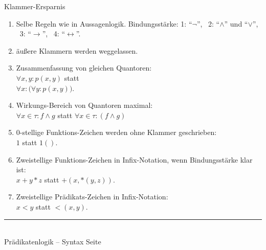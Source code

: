 \documentclass{slides}
\newcommand{\myrule}{\rule{20cm}{1mm}\\ }
\newcounter{mypage}
\begin{document}

\begin{slide}{}
\normalsize
\begin{center}
Klammer-Ersparnis
\end{center}
\vspace{0.5cm}

\footnotesize
\begin{enumerate}
\item Selbe Regeln wie in Aussagenlogik. Bindungsst\"{a}rke: 
  1: ``$\neg$'', \ 2: ``$\wedge$'' und ``$\vee$'', \ 3: ``$\rightarrow$'', \ 4: ``$\leftrightarrow$''.
\item \"{a}ußere Klammern werden weggelassen.
\item Zusammenfassung von gleichen Quantoren: \\[0.3cm]
      \hspace*{1.3cm} $\forall x, y: p(x, y)$  
      statt \\[0.3cm]
      \hspace*{1.3cm} $\forall x: \Bigg( \forall y: p(x,y) \Bigg)$. 
\item Wirkungs-Bereich von Quantoren maximal: \\[0.3cm]
      \hspace*{1.3cm} $\forall x\in\tau: f \wedge g$ \quad statt \quad $\forall x\in\tau: (f \wedge g)$
\item 0-stellige Funktions-Zeichen werden ohne Klammer geschrieben: \\[0.3cm]
      \hspace*{1.3cm} $1$ \quad statt \quad $1()$.
\item Zweistellige Funktions-Zeichen in Infix-Notation,
      wenn Bindungsst\"{a}rke klar ist: \\[0.3cm]
      \hspace*{1.3cm} $x + y * z$ \quad statt \quad $+(x, *(y,z))$.
\item Zweistellige Pr\"{a}dikats-Zeichen in Infix-Notation: \\[0.3cm]
      \hspace*{1.3cm} $x < y$ \quad statt \quad $<(x, y)$.
\end{enumerate}

\vspace*{\fill}
\tiny \addtocounter{mypage}{1}
\myrule
Pr\"{a}dikatenlogik -- Syntax  \hspace*{\fill} Seite 
\end{slide}
\end{document}
